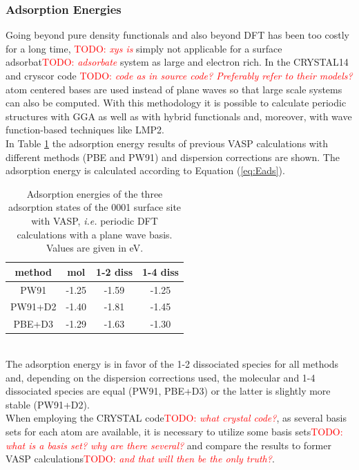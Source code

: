 \documentclass[11pt,DIV=13,BCOR=5mm,a4paper,headinclude]{scrbook}
\newcommand\todo[1]{\textcolor{red}{TODO: \textit{{#1}}}}
\begin{document}
\subsubsection{Adsorption Energies}
Going beyond pure density functionals and also beyond DFT has been too costly for a long time, \todo{xys is} simply not applicable for a surface adsorbat\todo{adsorbate} system as large and electron rich.
In the CRYSTAL14\cite{crystal14} and cryscor\cite{cryscor} code \todo{code as in source code? Preferably refer to their models?} atom centered bases are used instead of plane waves so that large scale systems can also be computed.
With this methodology it is possible to calculate periodic structures with GGA as well as with hybrid functionals and, moreover, with wave function-based techniques like LMP2.\\
In Table \ref{tab:vasp-results} the adsorption energy results of previous VASP calculations with different methods (PBE and PW91) and dispersion corrections are shown.
The adsorption energy is calculated according to Equation (\ref{eq:Eads}).
\begin{table}[!h]
  \centering
   \caption{Adsorption energies of the three adsorption states of the 0001 surface site with VASP, \textit{i.e.}
periodic DFT calculations with a plane wave basis.
Values are given in eV.}
  \begin{tabular}{c|ccc}%
  \toprule
  method & mol & 1-2 diss & 1-4 diss\\\midrule %
  PW91   &-1.25 &-1.59 &-1.25 \\%
  PW91+D2&-1.40 &-1.81 &-1.45 \\%
  PBE+D3 &-1.29&-1.63 &-1.30 \\\bottomrule%
  \end{tabular}
  \label{tab:vasp-results}
 \end{table}
\\
The adsorption energy is in favor of the 1-2 dissociated species for all methods and, depending on the dispersion corrections used, the molecular and 1-4 dissociated species are equal (PW91, PBE+D3) or the latter is slightly more stable (PW91+D2).
\\
When employing the CRYSTAL code\todo{what crystal code?}, as several basis sets for each atom are available, it is necessary to utilize some basis sets\todo{what is a basis set? why are there several?} and compare the results to former VASP calculations\todo{and that will then be the only truth?}.
\end{document}
